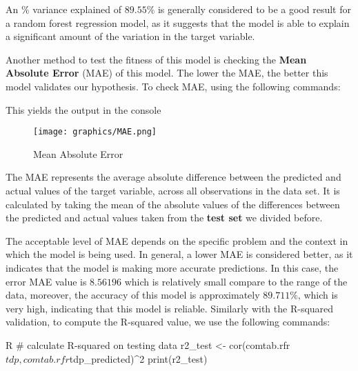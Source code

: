 An $\%$ variance explained of $89.55\%$ is generally considered to be a good result for a random forest regression model, as it suggests that the model is able to explain a significant amount of the variation in the target variable.

Another method to test the fitness of this model is checking the \textbf{Mean Absolute Error} (MAE) of this model. The lower the MAE, the better this model validates our hypothesis. To check MAE, using the following commands:

This yields the output in the console
\begin{figure}[H]
    \centering
    \texttt{[image: graphics/MAE.png]}
    \caption{Mean Absolute Error}
    \label{fig:MAE}
\end{figure}
The MAE represents the average absolute difference between the predicted and actual values of the target variable, across all observations in the data set. It is calculated by taking the mean of the absolute values of the differences between the predicted and actual values taken from the \textbf{test set} we divided before.

The acceptable level of MAE depends on the specific problem and the context in which the model is being used. In general, a lower MAE is considered better, as it indicates that the model is making more accurate predictions. In this case, the error MAE value is $8.56196$ which is relatively small compare to the range of the data, moreover, the accuracy of this model is approximately $89.711\%$, which is very high, indicating that this model is reliable. Similarly with the R-squared validation, to compute the R-squared value, we use the following commands:
\begin{code}{R}
# calculate R-squared on testing data
r2_test <- cor(comtab.rfr$tdp, comtab.rfr$tdp_predicted)^2
print(r2_test)
\end{code}

